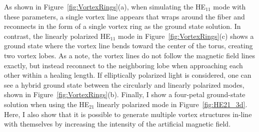 As shown in Figure~\ref{fig:VortexRings}(a), when simulating the HE$_{11}$ mode with these parameters, a single vortex line appears that wraps around the fiber and reconnects in the form of a single vortex ring as the ground state solution.
In contrast, the linearly polarized HE$_{11}$ mode in Figure~\ref{fig:VortexRings}(c) shows a ground state where the vortex line bends toward the center of the torus, creating two vortex lobes.
As a note, the vortex lines do not follow the magnetic field lines exactly, but instead reconnect to the neighboring lobe when approaching each other within a healing length.
If elliptically polarized light is considered, one can see a hybrid ground state between the circularly and linearly polarized modes, shown in Figure~\ref{fig:VortexRings}(b).
Finally, I show a four-petal ground-state solution when using the HE$_{21}$ linearly polarized mode in Figure~\ref{fig:HE21_3d}.
Here, I also show that it is possible to generate multiple vortex structures in-line with themselves by increasing the intensity of the artificial magnetic field.

